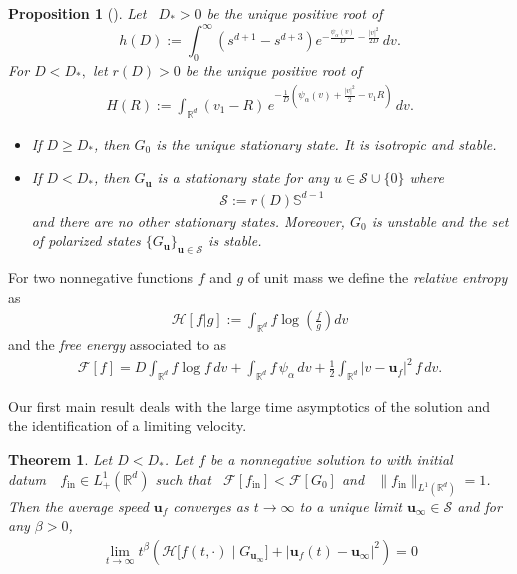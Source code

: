\documentclass[reqno]{amsart} %
\newtheorem{theorem}{Theorem}[section]
\newtheorem{proposition}{Proposition}[section]
\begin{document}
\begin{proposition}[{\rm \cite[Theorem~1.1]{Li2021}}]
\label{prop0}
Let ~$D_*>0$ be the unique positive root of 
\[h(D):=\int_{0}^{\infty}\left(s^{d+1}-s^{d+3} \right)e^{-\frac{\psi_{\alpha}(v)}{D}-\frac{|v|^2}{2D}}\,dv.\] 
For $D<D_*,$ let  $r(D)>0$ be the unique positive root of 
\begin{align}
\label{H}
     {H}(R):= \int_{\mathbb{R}^d}{(v_1-R)\,e^{-\frac{1}{D}\left(\psi_{\alpha}(v)+\frac{|v|^2}{2}-v_1R\right)}}\, dv. 
\end{align}

\begin{itemize}
    \item If $D\geq D_*$, then $G_0$ is the unique stationary state. It is isotropic and stable.
    \item If $D<D_*$, then 
    $G_\mathbf{u}$ is a stationary state for any $u\in \mathcal{S}\cup \{0\}$ where \begin{align}
    \label{S}
        \mathcal{S}:=r(D)\mathbb{S}^{d-1}
    \end{align} and there are no other stationary states. Moreover, $G_0$ is unstable and the set of polarized states $\{G_\mathbf{u}\}_{\mathbf{u} \in \mathcal{S}}$  is stable.
    
\end{itemize}
\end{proposition}

    

\noindent For two nonnegative functions $f$ and $g$ of unit mass  we define the \emph{relative entropy} as  
\begin{align*}
    \mathcal{H}[f|g]:= \int_{\mathbb{R}^d} f\log\left(\frac{f}{g}\right)dv
\end{align*}
and the \emph{free energy} associated to   as
\begin{align}
\label{freenergy}
    \mathcal{F}[f]= D\int_{\mathbb{R}^d} f \log f \,dv + \int_{\mathbb{R}^d} f \,\psi_{\alpha} \,dv +\frac{1}{2}\int_{\mathbb{R}^d} |v-\mathbf{u}_{f}|^2\,f\,dv.
\end{align}


Our first main result deals with the large time asymptotics of the solution and the identification of a limiting velocity.


\begin{theorem}{}
\label{thm2}
Let $D<D_*$. Let $f$ be a nonnegative solution to  with  initial \\ \mbox{datum ~$f_{\mathrm{\mathrm{in}} } \in L^1_+(\mathbb{R}^d)$} such that ~$\mathcal{F}[f_{\mathrm{\mathrm{in}}}]<\mathcal{F}[G_{0}]$ and ~$\| f_{\mathrm{in}}\|_{L^1(\mathbb{R}^d)}=1$. Then
   the average speed $\mathbf{u}_{f}$ converges as $t \rightarrow\infty$ to a unique limit $\mathbf{u}_{\infty} \in \mathcal{S}$ and for any $\beta>0$,
  \begin{align*}
\lim_{t\rightarrow \infty} t^{\beta}\left(\mathcal{H}\big[f(t,\cdot) \mid G_{\mathbf{u}_{\infty}}\big] + |\mathbf{u}_{f}(t) - \mathbf{u}_{\infty}|^2\right) = 0
\end{align*}

\end{theorem}
\end{document}
